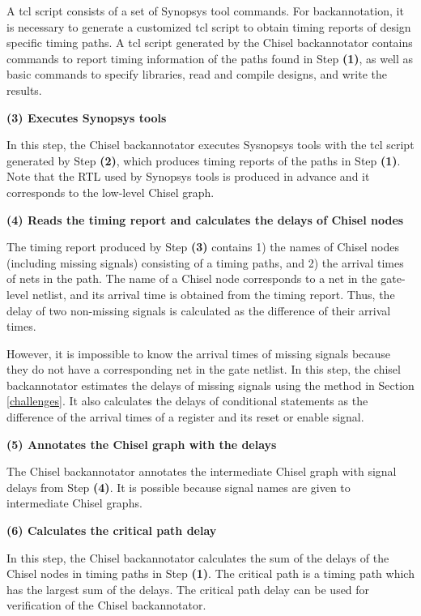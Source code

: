 A tcl script consists of a set of Synopsys tool commands. For backannotation, it is necessary to generate a customized tcl script to obtain timing reports of design specific timing paths. A tcl script generated by the Chisel backannotator contains commands to report timing information of the paths found in Step {\bf (1)}, as well as basic commands to specify libraries, read and compile designs, and write the results. 

{\bf (3) Executes Synopsys tools}

In this step, the Chisel backannotator executes Sysnopsys tools with the tcl script generated by Step {\bf (2)}, which produces timing reports of the paths in Step {\bf (1)}. Note that the RTL used by Synopsys tools is produced in advance and it corresponds to the low-level Chisel graph.

{\bf (4) Reads the timing report and calculates the delays of Chisel nodes}

The timing report produced by Step {\bf (3)} contains 1) the names of Chisel nodes (including missing signals) consisting of a timing paths, and 2) the arrival times of nets in the path. The name of a Chisel node corresponds to a net in the gate-level netlist, and its arrival time is obtained from the timing report. Thus, the delay of two non-missing signals is calculated as the difference of their arrival times.

However, it is impossible to know the arrival times of missing signals because they do not have a corresponding net in the gate netlist. In this step, the chisel backannotator estimates the delays of missing signals using the method in Section \ref{challenges}. It also calculates the delays of conditional statements as the difference of the arrival times of a register and its reset or enable signal.

{\bf (5) Annotates the Chisel graph with the delays}

The Chisel backannotator annotates the intermediate Chisel graph with signal delays from Step {\bf (4)}. It is possible because signal names are given to intermediate Chisel graphs.

{\bf (6) Calculates the critical path delay}

In this step, the Chisel backannotator calculates the sum of the delays of the Chisel nodes in timing paths in Step {\bf (1)}. The critical path is a timing path which has the largest sum of the delays. The critical path delay can be used for verification of the Chisel backannotator.

